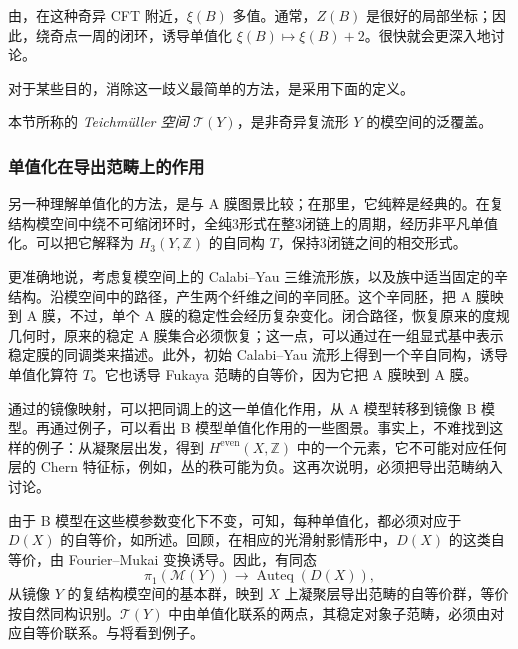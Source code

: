 由，在这种奇异 CFT 附近，$\xi(B)$ 多值。通常，$Z(B)$ 是很好的局部坐标；因此，绕奇点一周的闭环，诱导单值化 $\xi(B)\mapsto\xi(B)+2$。很快就会更深入地讨论。

对于某些目的，消除这一歧义最简单的方法，是采用下面的定义。
\begin{definition}\label{def:5.30}
本节所称的 \emph{Teichm\"uller 空间} $\mathcal{T}(Y)$，是非奇异复流形 $Y$ 的模空间的泛覆盖。
\end{definition}

\subsubsection{单值化在导出范畴上的作用}\label{sec:5.5.3.1}

另一种理解单值化的方法，是与 A 膜图景比较；在那里，它纯粹是经典的。在复结构模空间中绕不可缩闭环时，全纯3形式在整3闭链上的周期，经历非平凡单值化。可以把它解释为 $H_3(Y,\mathbb{Z})$ 的自同构 $T$，保持3闭链之间的相交形式。

更准确地说，考虑复模空间上的 Calabi--Yau 三维流形族，以及族中适当固定的辛结构。沿模空间中的路径，产生两个纤维之间的辛同胚。这个辛同胚，把 A 膜映到 A 膜，不过，单个 A 膜的稳定性会经历复杂变化。闭合路径，恢复原来的度规几何时，原来的稳定 A 膜集合必须恢复；这一点，可以通过在一组显式基中表示稳定膜的同调类来描述。此外，初始 Calabi--Yau 流形上得到一个辛自同构，诱导单值化算符 $T$。它也诱导 Fukaya 范畴的自等价，因为它把 A 膜映到 A 膜。

通过的镜像映射，可以把同调上的这一单值化作用，从 A 模型转移到镜像 B 模型。再通过例子，可以看出 B 模型单值化作用的一些图景。事实上，不难找到这样的例子：从凝聚层出发，得到 $H^{\mathrm{even}}(X,\mathbb{Z})$ 中的一个元素，它不可能对应任何层的 Chern 特征标，例如，丛的秩可能为负。这再次说明，必须把导出范畴纳入讨论。

由于 B 模型在这些模参数变化下不变，可知，每种单值化，都必须对应于 $D(X)$ 的自等价，如所述。回顾，在相应的光滑射影情形中，$D(X)$ 的这类自等价，由 Fourier--Mukai 变换诱导。因此，有同态
\begin{equation}\label{eq:5.127}
\pi_1(\mathcal{M}(Y))\longrightarrow\operatorname{Auteq}(D(X)),
\end{equation}
从镜像 $Y$ 的复结构模空间的基本群，映到 $X$ 上凝聚层导出范畴的自等价群，等价按自然同构识别。$\mathcal{T}(Y)$ 中由单值化联系的两点，其稳定对象子范畴，必须由对应自等价联系。与将看到例子。

